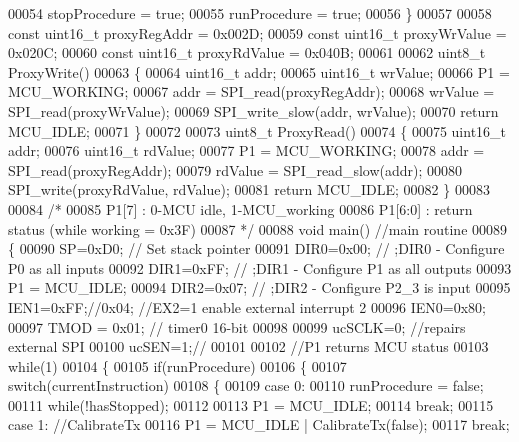 \begin{DoxyCode}
00054     stopProcedure = \textcolor{keyword}{true};
00055     runProcedure = \textcolor{keyword}{true};
00056 \}
00057 
00058 \textcolor{keyword}{const} uint16\_t proxyRegAddr = 0x002D;
00059 \textcolor{keyword}{const} uint16\_t proxyWrValue = 0x020C;
00060 \textcolor{keyword}{const} uint16\_t proxyRdValue = 0x040B;
00061 
00062 uint8\_t ProxyWrite()
00063 \{
00064     uint16\_t addr;
00065     uint16\_t wrValue;
00066     P1 = MCU_WORKING;
00067     addr = SPI_read(proxyRegAddr);
00068     wrValue = SPI_read(proxyWrValue);
00069     SPI_write_slow(addr, wrValue);
00070     \textcolor{keywordflow}{return} MCU_IDLE;
00071 \}
00072 
00073 uint8\_t ProxyRead()
00074 \{
00075     uint16\_t addr;
00076     uint16\_t rdValue;
00077     P1 = MCU_WORKING;
00078     addr = SPI_read(proxyRegAddr);
00079     rdValue = SPI_read_slow(addr);
00080     SPI_write(proxyRdValue, rdValue);
00081     \textcolor{keywordflow}{return} MCU_IDLE;
00082 \}
00083 
00084 \textcolor{comment}{/*}
00085 \textcolor{comment}{    P1[7] : 0-MCU idle, 1-MCU\_working}
00086 \textcolor{comment}{    P1[6:0] : return status (while working = 0x3F)}
00087 \textcolor{comment}{*/}
00088 \textcolor{keywordtype}{void} main()  \textcolor{comment}{//main routine}
00089 \{
00090     SP=0xD0; \textcolor{comment}{// Set stack pointer}
00091     DIR0=0x00; \textcolor{comment}{// ;DIR0 - Configure P0 as all inputs}
00092     DIR1=0xFF;  \textcolor{comment}{// ;DIR1 - Configure P1 as all outputs}
00093     P1 = MCU_IDLE;
00094     DIR2=0x07;  \textcolor{comment}{// ;DIR2 -  Configure P2\_3 is input}
00095     IEN1=0xFF;\textcolor{comment}{//0x04;  //EX2=1 enable external interrupt 2}
00096     IEN0=0x80;
00097     TMOD = 0x01; \textcolor{comment}{// timer0 16-bit}
00098 
00099     ucSCLK=0; \textcolor{comment}{//repairs external SPI}
00100     ucSEN=1;\textcolor{comment}{//}
00101 
00102     \textcolor{comment}{//P1 returns MCU status}
00103     \textcolor{keywordflow}{while}(1)
00104     \{
00105         \textcolor{keywordflow}{if}(runProcedure)
00106         \{
00107             \textcolor{keywordflow}{switch}(currentInstruction)
00108             \{
00109             \textcolor{keywordflow}{case} 0:
00110                 runProcedure = \textcolor{keyword}{false};
00111                 \textcolor{keywordflow}{while}(!hasStopped);
00112 
00113                 P1 = MCU_IDLE;
00114                 \textcolor{keywordflow}{break};
00115             \textcolor{keywordflow}{case} 1: \textcolor{comment}{//CalibrateTx}
00116                 P1 = MCU_IDLE | CalibrateTx(\textcolor{keyword}{false});
00117                 \textcolor{keywordflow}{break};

\end{DoxyCode}
